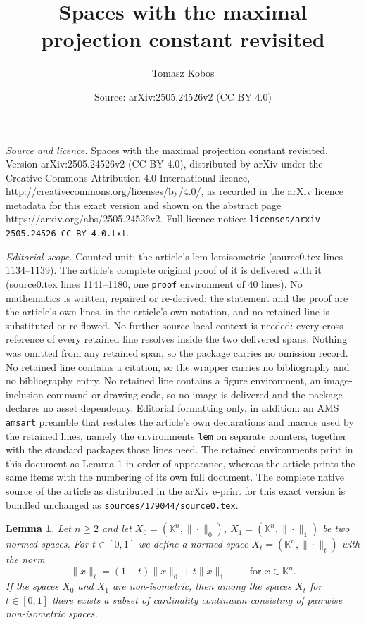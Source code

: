 \documentclass[10pt,a4paper]{amsart}
\title{Spaces with the maximal projection constant revisited}
\author{Tomasz Kobos}
\date{Source: arXiv:2505.24526v2 (CC BY 4.0)}
\newtheorem{lem}{Lemma}
\begin{document}
\maketitle

\noindent\emph{Source and licence.} Spaces with the maximal projection constant revisited. Version arXiv:2505.24526v2 (CC BY 4.0), distributed by arXiv under the Creative Commons Attribution 4.0 International licence, http://creativecommons.org/licenses/by/4.0/, as recorded in the arXiv licence metadata for this exact version and shown on the abstract page https://arxiv.org/abs/2505.24526v2. Full licence notice: \texttt{licenses/arxiv-2505.24526-CC-BY-4.0.txt}.\par\smallskip

\noindent\textit{Editorial scope.} Counted unit: the article's lem lemisometric (source0.tex lines 1134--1139). The article's complete original proof of it is delivered with it (source0.tex lines 1141--1180, one \texttt{proof} environment of 40 lines). No mathematics is written, repaired or re-derived: the statement and the proof are the article's own lines, in the article's own notation, and no retained line is substituted or re-flowed.  No further source-local context is needed: every cross-reference of every retained line resolves inside the two delivered spans.  Nothing was omitted from any retained span, so the package carries no omission record.  No retained line contains a citation, so the wrapper carries no bibliography and no bibliography entry.  No retained line contains a figure environment, an image-inclusion command or drawing code, so no image is delivered and the package declares no asset dependency.  Editorial formatting only, in addition: an AMS \texttt{amsart} preamble that restates the article's own declarations and macros used by the retained lines, namely the environments \texttt{lem} on separate counters, together with the standard packages those lines need.  The retained environments print in this document as Lemma 1 in order of appearance, whereas the article prints the same items with the numbering of its own full document.  The complete native source of the article as distributed in the arXiv e-print for this exact version is bundled unchanged as \texttt{sources/179044/source0.tex}.
\begin{lem}
\label{lemisometric}
Let $n \geq 2$ and let $X_0 = (\mathbb{K}^n, \| \cdot\|_0)$, $X_1=(\mathbb{K}^n, \| \cdot\|_1)$ be two normed spaces. For $t \in [0, 1]$ we define a normed space $X_t = (\mathbb{K}^n, \| \cdot \|_t)$ with the norm
$$\|x\|_t = (1-t)\|x\|_0 + t\|x\|_1 \qquad \text{ for } x \in \mathbb{K}^n.$$
If the spaces $X_0$ and $X_1$ are non-isometric, then among the spaces $X_t$ for $t\in[0,1]$ there exists a subset of cardinality continuum consisting of pairwise non-isometric spaces.
\end{lem}
\end{document}
